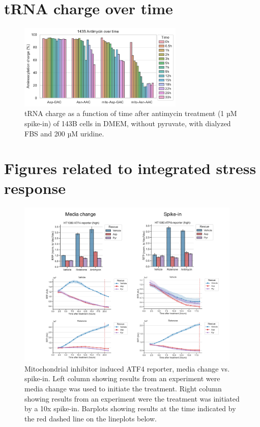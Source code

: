 \section{tRNA charge over time}
\begin{figure}[ht]
    \centering
    \includegraphics[width=0.7\textwidth]{figures/chap2/app/143B_Anti-time_Asp-Asn.pdf}
    \caption[Antimycin time-series in 143B, effect on tRNA charge.]{
        tRNA charge as a function of time after antimycin treatment (1 µM spike-in) of 143B cells in DMEM, without pyruvate, with dialyzed FBS and 200 µM uridine.
    }
    \label{fig:app_ch2:143B_Anti_time}
\end{figure}




\section{Figures related to integrated stress response}
\label{sec:ch2:app:ISR}
\begin{figure}[ht]
    \centering
    \includegraphics[width=0.95\textwidth]{figures/chap2/app/atf4_chVSsp.pdf}
    \caption[ATF4 reporter, media change vs. spike-in.]{
    Mitochondrial inhibitor induced ATF4 reporter, media change vs. spike-in.
    Left column showing results from an experiment were media change was used to initiate the treatment.
    Right column showing results from an experiment were the treatment was initiated by a 10x spike-in.
    Barplots showing results at the time indicated by the red dashed line on the lineplots below.
    }
    \label{fig:app_ch2:atf4_chVSsp}
\end{figure}


